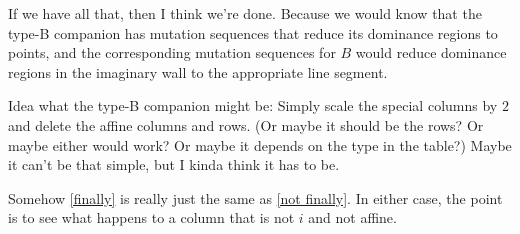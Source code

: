 \documentclass{amsart}
\theoremstyle{definition}
\theoremstyle{remark}
\numberwithin{equation}{section}
\newcommand{\0}{{\mathbf{0}}}
\begin{document}
If we have all that, then I think we're done.  
Because we would know that the type-B companion has mutation sequences that reduce its dominance regions to points, and the corresponding mutation sequences for $B$ would reduce dominance regions in the imaginary wall to the appropriate line segment.

Idea what the type-B companion might be:
Simply scale the special columns by $2$ and delete the affine columns and rows.
(Or maybe it should be the rows? Or maybe either would work?  Or maybe it depends on the type in the table?)
Maybe it can't be that simple, but I kinda think it has to be.

Somehow \cref{finally} is really just the same as \cref{not finally}.  
In either case, the point is to see what happens to a column that is not $i$ and not affine.
\end{document}
